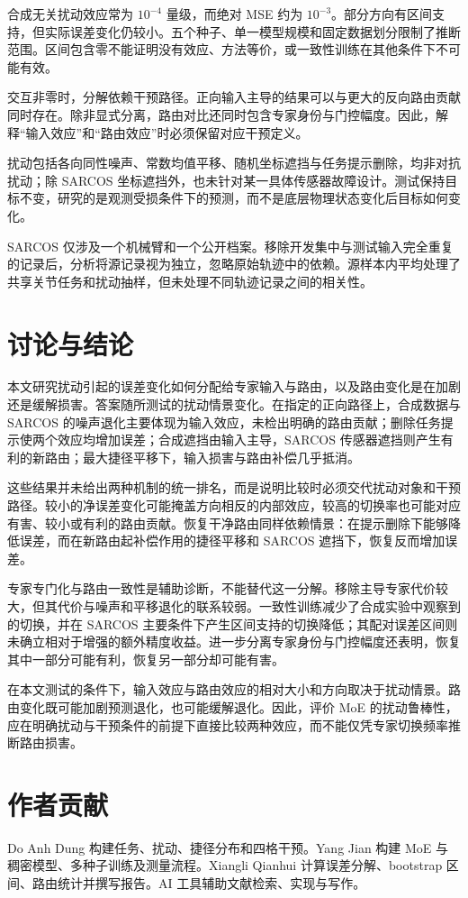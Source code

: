 \documentclass[10pt,letterpaper]{article}
\begin{document}
合成无关扰动效应常为 $10^{-4}$ 量级，而绝对 MSE 约为 $10^{-3}$。部分方向有区间支持，但实际误差变化仍较小。五个种子、单一模型规模和固定数据划分限制了推断范围。区间包含零不能证明没有效应、方法等价，或一致性训练在其他条件下不可能有效。


交互非零时，分解依赖干预路径。正向输入主导的结果可以与更大的反向路由贡献同时存在。除非显式分离，路由对比还同时包含专家身份与门控幅度。因此，解释``输入效应''和``路由效应''时必须保留对应干预定义。


扰动包括各向同性噪声、常数均值平移、随机坐标遮挡与任务提示删除，均非对抗扰动；除 SARCOS 坐标遮挡外，也未针对某一具体传感器故障设计。测试保持目标不变，研究的是观测受损条件下的预测，而不是底层物理状态变化后目标如何变化。


SARCOS 仅涉及一个机械臂和一个公开档案。移除开发集中与测试输入完全重复的记录后，分析将源记录视为独立，忽略原始轨迹中的依赖。源样本内平均处理了共享关节任务和扰动抽样，但未处理不同轨迹记录之间的相关性。


\FloatBarrier

\section{讨论与结论}

本文研究扰动引起的误差变化如何分配给专家输入与路由，以及路由变化是在加剧还是缓解损害。答案随所测试的扰动情景变化。在指定的正向路径上，合成数据与 SARCOS 的噪声退化主要体现为输入效应，未检出明确的路由贡献；删除任务提示使两个效应均增加误差；合成遮挡由输入主导，SARCOS 传感器遮挡则产生有利的新路由；最大捷径平移下，输入损害与路由补偿几乎抵消。


这些结果并未给出两种机制的统一排名，而是说明比较时必须交代扰动对象和干预路径。较小的净误差变化可能掩盖方向相反的内部效应，较高的切换率也可能对应有害、较小或有利的路由贡献。恢复干净路由同样依赖情景：在提示删除下能够降低误差，而在新路由起补偿作用的捷径平移和 SARCOS 遮挡下，恢复反而增加误差。


专家专门化与路由一致性是辅助诊断，不能替代这一分解。移除主导专家代价较大，但其代价与噪声和平移退化的联系较弱。一致性训练减少了合成实验中观察到的切换，并在 SARCOS 主要条件下产生区间支持的切换降低；其配对误差区间则未确立相对于增强的额外精度收益。进一步分离专家身份与门控幅度还表明，恢复其中一部分可能有利，恢复另一部分却可能有害。


在本文测试的条件下，输入效应与路由效应的相对大小和方向取决于扰动情景。路由变化既可能加剧预测退化，也可能缓解退化。因此，评价 MoE 的扰动鲁棒性，应在明确扰动与干预条件的前提下直接比较两种效应，而不能仅凭专家切换频率推断路由损害。


\FloatBarrier

\section*{作者贡献}

Do Anh Dung 构建任务、扰动、捷径分布和四格干预。Yang Jian 构建 MoE 与稠密模型、多种子训练及测量流程。Xiangli Qianhui 计算误差分解、bootstrap 区间、路由统计并撰写报告。AI 工具辅助文献检索、实现与写作。


\FloatBarrier

\nocite{*}




\end{document}
